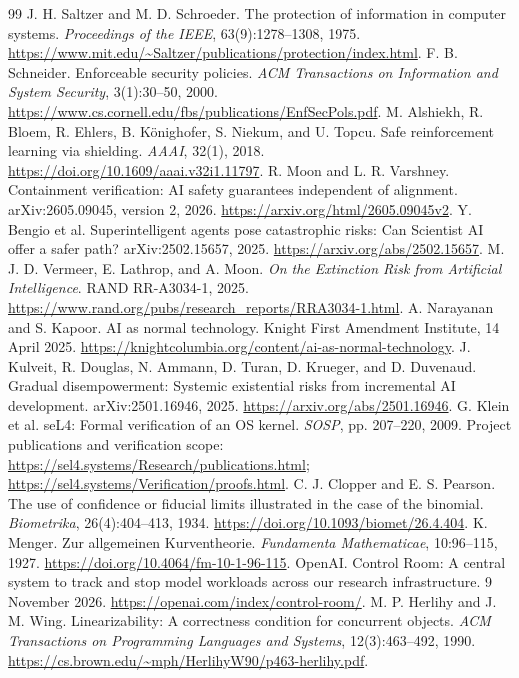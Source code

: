 \documentclass[10pt,twocolumn,letterpaper]{article}
\begin{document}
\begin{thebibliography}{99}
 J. H. Saltzer and M. D. Schroeder. The protection of information in computer systems. \emph{Proceedings of the IEEE}, 63(9):1278--1308, 1975. \url{https://www.mit.edu/~Saltzer/publications/protection/index.html}.
 F. B. Schneider. Enforceable security policies. \emph{ACM Transactions on Information and System Security}, 3(1):30--50, 2000. \url{https://www.cs.cornell.edu/fbs/publications/EnfSecPols.pdf}.
 M. Alshiekh, R. Bloem, R. Ehlers, B. K\"onighofer, S. Niekum, and U. Topcu. Safe reinforcement learning via shielding. \emph{AAAI}, 32(1), 2018. \url{https://doi.org/10.1609/aaai.v32i1.11797}.
 R. Moon and L. R. Varshney. Containment verification: AI safety guarantees independent of alignment. arXiv:2605.09045, version 2, 2026. \url{https://arxiv.org/html/2605.09045v2}.
 Y. Bengio et al. Superintelligent agents pose catastrophic risks: Can Scientist AI offer a safer path? arXiv:2502.15657, 2025. \url{https://arxiv.org/abs/2502.15657}.
 M. J. D. Vermeer, E. Lathrop, and A. Moon. \emph{On the Extinction Risk from Artificial Intelligence}. RAND RR-A3034-1, 2025. \url{https://www.rand.org/pubs/research_reports/RRA3034-1.html}.
 A. Narayanan and S. Kapoor. AI as normal technology. Knight First Amendment Institute, 14 April 2025. \url{https://knightcolumbia.org/content/ai-as-normal-technology}.
 J. Kulveit, R. Douglas, N. Ammann, D. Turan, D. Krueger, and D. Duvenaud. Gradual disempowerment: Systemic existential risks from incremental AI development. arXiv:2501.16946, 2025. \url{https://arxiv.org/abs/2501.16946}.
 G. Klein et al. seL4: Formal verification of an OS kernel. \emph{SOSP}, pp. 207--220, 2009. Project publications and verification scope: \url{https://sel4.systems/Research/publications.html}; \url{https://sel4.systems/Verification/proofs.html}.
 C. J. Clopper and E. S. Pearson. The use of confidence or fiducial limits illustrated in the case of the binomial. \emph{Biometrika}, 26(4):404--413, 1934. \url{https://doi.org/10.1093/biomet/26.4.404}.
 K. Menger. Zur allgemeinen Kurventheorie. \emph{Fundamenta Mathematicae}, 10:96--115, 1927. \url{https://doi.org/10.4064/fm-10-1-96-115}.
 OpenAI. Control Room: A central system to track and stop model workloads across our research infrastructure. 9 November 2026. \url{https://openai.com/index/control-room/}.
 M. P. Herlihy and J. M. Wing. Linearizability: A correctness condition for concurrent objects. \emph{ACM Transactions on Programming Languages and Systems}, 12(3):463--492, 1990. \url{https://cs.brown.edu/~mph/HerlihyW90/p463-herlihy.pdf}.

\end{thebibliography}
\end{document}
